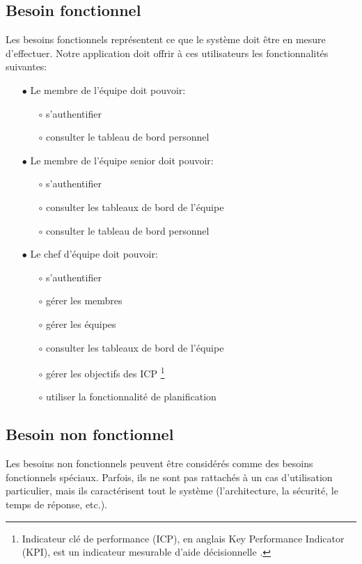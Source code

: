 \subsection{Besoin fonctionnel}
Les besoins fonctionnels représentent ce que le système doit être en mesure d'effectuer. Notre application doit offrir à ces utilisateurs les fonctionnalités suivantes: \\
\begin{itemize}
	\item[$\bullet$] Le membre de l'équipe doit pouvoir:
     \begin{itemize}
     	\item[$\circ$] s'authentifier
        \item[$\circ$] consulter le tableau de bord personnel\\
    \end{itemize}
    \item[$\bullet$] Le membre de l'équipe senior doit pouvoir:
    \begin{itemize}
     	\item[$\circ$] s'authentifier
        \item[$\circ$] consulter les tableaux de bord de l'équipe 
        \item[$\circ$] consulter le tableau de bord personnel\\
    \end{itemize}
	\item[$\bullet$] Le chef d'équipe doit pouvoir:
    \begin{itemize}
    	\item[$\circ$] s'authentifier
        \item[$\circ$] gérer les membres
        \item[$\circ$] gérer les équipes
        \item[$\circ$] consulter les tableaux de bord de l'équipe
        \item[$\circ$] gérer les objectifs des ICP \footnote{Indicateur clé de performance (ICP), en anglais Key Performance Indicator (KPI), est un indicateur mesurable d'aide décisionnelle \cite{ICP}.}
        \item[$\circ$] utiliser la fonctionnalité de planification
     
     
     \end{itemize}
\end{itemize}
\subsection{Besoin non fonctionnel}
Les besoins non fonctionnels peuvent être considérés comme des besoins
fonctionnels spéciaux. Parfois, ils ne sont pas rattachés à un cas d’utilisation
particulier, mais ils caractérisent tout le système (l’architecture, la sécurité, le temps
de réponse, etc.).


